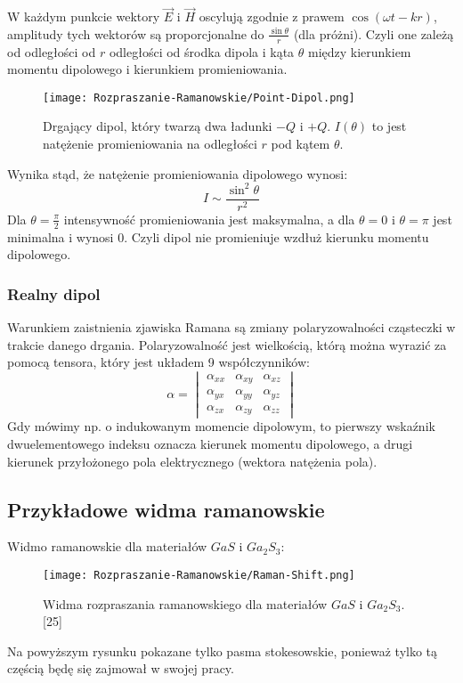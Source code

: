W każdym punkcie wektory $\overrightarrow{E}$ i $\overrightarrow{H}$ oscylują zgodnie z prawem $\cos(\omega t - kr)$, amplitudy tych wektorów są proporcjonalne do
$\frac{\sin \theta}{r}$ (dla próżni). Czyli one zależą od odległości od $r$ odległości od środka dipola i kąta $\theta$ między kierunkiem momentu dipolowego i kierunkiem promieniowania.
\begin{figure}[H]
	\begin{center}
		\texttt{[image: Rozpraszanie-Ramanowskie/Point-Dipol.png]}
		\caption{Drgający dipol, który twarzą dwa ładunki $-Q$ i $+Q$. $I(\theta)$ to jest natężenie promieniowania na odległości $r$ pod kątem $\theta$.}
	\end{center}
\end{figure}
Wynika stąd, że natężenie promieniowania dipolowego wynosi:
\begin{equation}
	I \sim \frac{\sin^{2}\theta}{r^{2}}
\end{equation}
Dla $\theta = \frac{\pi}{2}$ intensywność promieniowania jest maksymalna, a dla 
$\theta = 0$ i $\theta = \pi$ jest minimalna i wynosi $0$. Czyli dipol nie promieniuje wzdłuż kierunku momentu dipolowego.
\subsubsection{Realny dipol}
Warunkiem zaistnienia zjawiska Ramana są zmiany polaryzowalności cząsteczki w trakcie danego drgania. Polaryzowalność jest wielkością, którą można wyrazić za pomocą tensora, który jest układem 9 współczynników:
\begin{equation}
	\alpha = 
	\begin{vmatrix}
	\alpha_{xx} & \alpha_{xy} & \alpha_{xz} \\
	\alpha_{yx} & \alpha_{yy} & \alpha_{yz} \\
	\alpha_{zx} & \alpha_{zy} & \alpha_{zz}
	\end{vmatrix}
\end{equation}
Gdy mówimy np. o indukowanym momencie dipolowym, to pierwszy wskaźnik dwuelementowego indeksu oznacza kierunek momentu dipolowego, a drugi kierunek przyłożonego pola elektrycznego (wektora natężenia pola).

\newpage
\subsection{Przykładowe widma ramanowskie}
Widmo ramanowskie dla materiałów $GaS$ i $Ga_{2}S_{3}$:
\begin{figure}[H]
	\begin{center}
		\texttt{[image: Rozpraszanie-Ramanowskie/Raman-Shift.png]}
		\caption{Widma rozpraszania ramanowskiego dla materiałów $GaS$ i $Ga_{2}S_{3}$.[25]}
	\end{center}
\end{figure}
Na powyższym rysunku pokazane tylko pasma stokesowskie, ponieważ tylko tą częścią będę się zajmował w swojej pracy.

